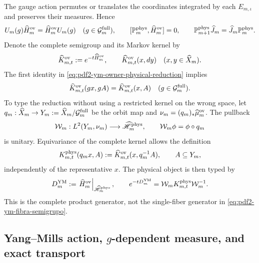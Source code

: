The gauge action permutes or translates the coordinates integrated by each
$E_{m,\iota}$ and
preserves their measures. Hence
\begin{equation}\label{eq:pdf2-ym-owner-physical-reduction}
 U_m(g)\widehat H_m^{\rm ov}=\widehat H_m^{\rm ov}U_m(g)
 \quad(g\in\mathcal G_m^{\rm full}),
 \qquad
 [\mathbb P_m^{\rm phys},\widehat H_m^{\rm ov}]=0,
 \qquad
 \mathbb P_{m+1}^{\rm phys}\widehat J_m
 =\widehat J_m\mathbb P_m^{\rm phys}.
\end{equation}
Denote the complete semigroup and its Markov kernel by
\begin{equation}\label{eq:pdf2-ym-owner-full-kernel}
 \widehat K_{m,t}^{\rm ov}:=e^{-t\widehat H_m^{\rm ov}},
 \qquad
\widehat K_{m,t}^{\rm ov}(x,dy)
 \quad(x,y\in\widehat X_m).
\end{equation}
The first identity in \eqref{eq:pdf2-ym-owner-physical-reduction} implies
\begin{equation}\label{eq:pdf2-ym-owner-full-kernel-equivariance}
 \widehat K_{m,t}^{\rm ov}(gx,gA)
 =\widehat K_{m,t}^{\rm ov}(x,A)
 \quad(g\in\mathcal G_m^{\rm full}).
\end{equation}
To type the reduction without using a restricted kernel on the wrong space,
let $q_m:\widehat X_m\to Y_m:=\widehat X_m/\mathcal G_m^{\rm full}$ be the orbit
map and $\nu_m=(q_m)_*\widehat\mu_m^{\rm ov}$. The pullback
\begin{equation}\label{eq:pdf2-ym-owner-quotient-unitary}
 \mathcal W_m:L^2(Y_m,\nu_m)\longrightarrow
 \widehat{\mathscr H}_m^{\rm phys},
 \qquad \mathcal W_m\phi=\phi\circ q_m
\end{equation}
is unitary. Equivariance of the complete kernel allows the definition
\begin{equation}\label{eq:pdf2-ym-owner-physical-kernel}
 K_{m,t}^{\rm phys}(q_mx,A)
 :=\widehat K_{m,t}^{\rm ov}(x,q_m^{-1}A),
 \qquad A\subseteq Y_m,
\end{equation}
independently of the representative $x$. The physical object is then typed by
\begin{equation}\label{eq:pdf2-ym-owner-D}
 D_m^{\rm YM}
 :=\left.\widehat H_m^{\rm ov}\right|_{\widehat{\mathscr H}_m^{\rm phys}},
 \qquad
 e^{-tD_m^{\rm YM}}
 =\mathcal W_mK_{m,t}^{\rm phys}\mathcal W_m^{-1}.
\end{equation}
This is the complete product generator, not the single-fiber generator in
\eqref{eq:pdf2-ym-fibra-semigrupo}.

\subsection{Yang--Mills action, $g$-dependent measure, and exact transport}

